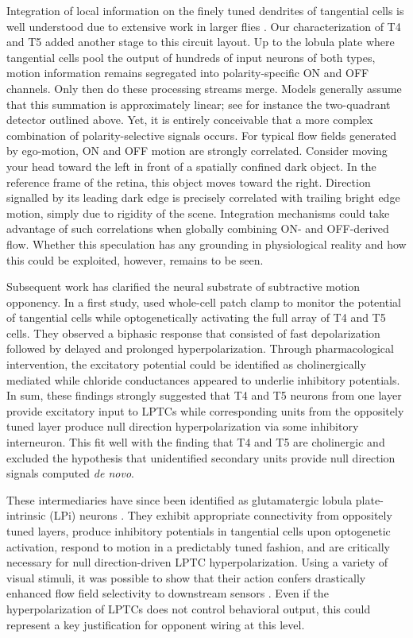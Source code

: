 Integration of local information on the finely tuned dendrites of tangential cells is well understood due to extensive work in larger flies \citep[see][]{Borst:2010fk}. Our characterization of T4 and T5 added another stage to this circuit layout. Up to the lobula plate where tangential cells pool the output of hundreds of input neurons of both types, motion information remains segregated into polarity-specific ON and OFF channels. Only then do these processing streams merge. Models generally assume that this summation is approximately linear; see for instance the two-quadrant detector outlined above. Yet, it is entirely conceivable that a more complex combination of polarity-selective signals occurs. For typical flow fields generated by ego-motion, ON and OFF motion are strongly correlated. Consider moving your head toward the left in front of a spatially confined dark object. In the reference frame of the retina, this object moves toward the right. Direction signalled by its leading dark edge is precisely correlated with trailing bright edge motion, simply due to rigidity of the scene. Integration mechanisms could take advantage of such correlations when globally combining ON- and OFF-derived flow. Whether this speculation has any grounding in physiological reality and how this could be exploited, however, remains to be seen.

Subsequent work has clarified the neural substrate of subtractive motion opponency. In a first study, \citet{Mauss:2014is} used whole-cell patch clamp to monitor the potential of tangential cells while optogenetically activating the full array of T4 and T5 cells. They observed a biphasic response that consisted of fast depolarization followed by delayed and prolonged hyperpolarization. Through pharmacological intervention, the excitatory potential could be identified as cholinergically mediated while chloride conductances appeared to underlie inhibitory potentials. In sum, these findings strongly suggested that T4 and T5 neurons from one layer provide excitatory input to LPTCs while corresponding units from the oppositely tuned layer produce null direction hyperpolarization via some inhibitory interneuron. This fit well with the finding that T4 and T5 are cholinergic \citep{Raghu:2011iy,Shinomiya:2014dx,Pankova:2016aa} and excluded the hypothesis that unidentified secondary units provide null direction signals computed \textit{de novo}.

These intermediaries have since been identified as glutamatergic lobula plate-intrinsic (LPi) neurons \citep{Mauss:2015kj}. They exhibit appropriate connectivity from oppositely tuned layers, produce inhibitory potentials in tangential cells upon optogenetic activation, respond to motion in a predictably tuned fashion, and are critically necessary for null direction-driven LPTC hyperpolarization. Using a variety of visual stimuli, it was possible to show that their action confers drastically enhanced flow field selectivity to downstream sensors \citep[see][]{Krapp:1996}. Even if the hyperpolarization of LPTCs does not control behavioral output, this could represent a key justification for opponent wiring at this level.

